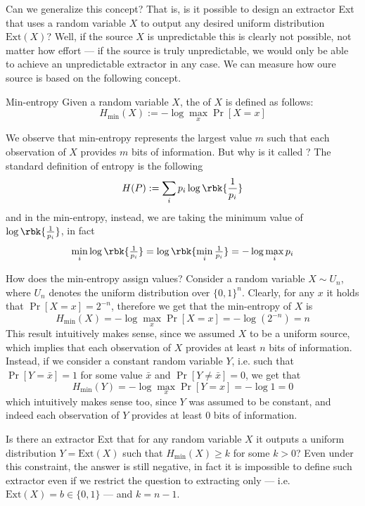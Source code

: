 \documentclass[a4paper, 12pt]{report}
\begin{document}
Can we generalize this concept? That is, is it possible to design an extractor Ext that uses a random variable $X$ to output any desired uniform distribution $\mbox{Ext}(X)$? Well, if the source $X$ is unpredictable this is clearly not possible, not matter how effort --- if the source is truly unpredictable, we would only be able to achieve an unpredictable extractor in any case. We can measure how  oure source is based on the following concept.

\begin{frameddefn}{Min-entropy}
	Given a random variable $X$, the  of $X$ is defined as follows: $$H_{\mathrm{min}}(X) := - \log{\max_x{\Pr[X = x]}}$$
\end{frameddefn}

We observe that min-entropy represents the largest value $m$ such that each observation of $X$ provides  $m$ bits of information. But why is it called ? The standard definition of entropy is the following $$H(P) := \sum_i{p_i \log \rbk{\dfrac{1}{p_i}}}$$ and in the min-entropy, instead, we are taking the minimum value of $\log \rbk{\tfrac{1}{p_i}}$, in fact $$\min_i{\log \rbk{\tfrac{1}{p_i}}} = \log \rbk{\min_i{\tfrac{1}{p_i}}} = - \log \max_i p_i$$

How does the min-entropy assign values? Consider a random variable $X \sim U_n$, where $U_n$ denotes the uniform distribution over $\{0, 1\}^n$. Clearly, for any $x$ it holds that $\Pr[X = x] = 2^{-n}$, therefore we get that the min-entropy of $X$ is $$H_\mathrm{min}(X) = - \log \max_x{\Pr[X = x]} = -\log(2^{-n}) = n$$ This result intuitively makes sense, since we assumed $X$ to be a uniform source, which implies that each observation of $X$ provides at least $n$ bits of information. Instead, if we consider a constant random variable $Y$, i.e. such that $\Pr[Y = \bar x] = 1$ for some value $\bar x$ and $\Pr[Y \neq \bar x] = 0$, we get that $$H_\mathrm{min}(Y) = - \log \max_x{\Pr[Y = x]} = - \log 1 = 0$$ which intuitively makes sense too, since $Y$ was assumed to be constant, and indeed each observation of $Y$ provides at least 0 bits of information.

Is there an extractor Ext that for any random variable $X$ it outputs a uniform distribution $Y = \mbox{Ext}(X)$ such that $H_\mathrm{min}(X) \ge k$ for some $k > 0$? Even under this constraint, the answer is still negative, in fact it is impossible to define such extractor even if we restrict the question to extracting only  --- i.e. $\mbox{Ext}(X) = b \in \{0, 1\}$ --- and $k = n - 1$.
\end{document}
